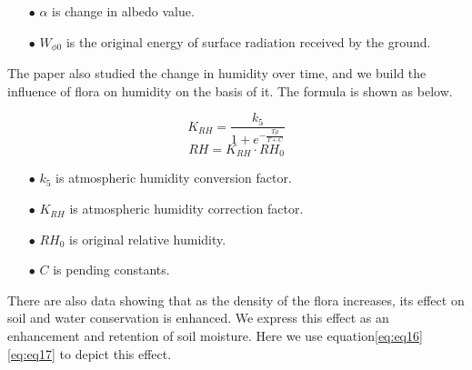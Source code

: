 \documentclass[12pt]{article}  %
\newenvironment{shrinkeq}[1]
{ \bgroup
	\addtolength\abovedisplayshortskip{#1}
	\addtolength\abovedisplayskip{#1}
	\addtolength\belowdisplayshortskip{#1}
	\addtolength\belowdisplayskip{#1}}
{\egroup\ignorespacesafterend}
\begin{document}
\begin{itemize}
\vspace{-0.2cm}
\item[$\bullet$] \textbf{$\alpha$ }is change in albedo value.

\vspace{-0.2cm}
\item[$\bullet$] \textbf{$W_{\phi 0}$ }is the original energy of surface radiation received by the ground.
\end{itemize}

The paper also studied the change in humidity over time{\cite{9}}, and we build the influence of flora on humidity on the basis of it. The formula is shown as below.

\begin{shrinkeq}{-1ex}
	\begin{equation}
    \label{eq:eq15}
    K_{RH}=\frac{k_5}{1+e^{-\frac{T\rho}{T+C}}}
	\end{equation}
\end{shrinkeq}
\begin{shrinkeq}{-1ex}
	\begin{equation}
    \label{eq:eq16}
    RH=K_{RH}\cdot RH_0
	\end{equation}
\end{shrinkeq}

\begin{itemize}
\vspace{-0.2cm}
\item[$\bullet$] \textbf{$k_5$ }is atmospheric humidity conversion factor.

\vspace{-0.2cm}
\item[$\bullet$] \textbf{$K_{RH}$ }is atmospheric humidity correction factor.

\vspace{-0.2cm}
\item[$\bullet$] \textbf{$RH_0$ }is original relative humidity.

\vspace{-0.2cm}
\item[$\bullet$] \textbf{$C$ }is pending constants.
\end{itemize}
\vspace{-0.3cm}

There are also data{\cite{8}} showing that as the density of the flora increases, its effect on soil and water conservation is enhanced. We express this effect as an enhancement and retention of soil moisture. Here we use equation\eqref{eq:eq16}\eqref{eq:eq17} to depict this effect.
\end{document}
